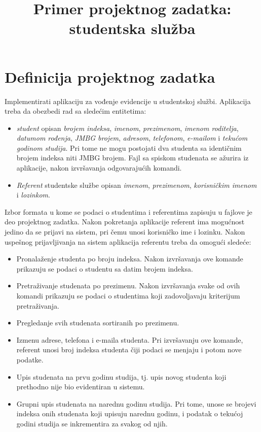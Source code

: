 \documentclass[a4paper]{article}
\title{Primer projektnog zadatka: studentska služba}
\date{}
\begin{document}
\maketitle

\section{Definicija projektnog zadatka}

Implementirati aplikaciju za vođenje evidencije u studentskoj službi. Aplikacija
treba da obezbedi rad sa sledećim entitetima:

\begin{itemize}
  \item \textit{student} opisan \textit{brojem indeksa}, \textit{imenom},
  \textit{prezimenom}, \textit{imenom roditelja},
  \textit{datumom rođenja}, \textit{JMBG brojem}, \textit{adresom},
  \textit{telefonom}, \textit{e-mailom} i \textit{tekućom godinom studija}. Pri
  tome ne mogu postojati dva studenta sa identičnim brojem indeksa niti JMBG
  brojem. Fajl sa spiskom studenata se ažurira iz aplikacije, nakon izvršavanja
  odgovarajućih komandi.

  \item \textit{Referent} studentske službe opisan \textit{imenom},
  \textit{prezimenom}, \textit{korisničkim imenom} i \textit{lozinkom}.
\end{itemize}

Izbor formata u kome se podaci o studentima i referentima zapisuju u fajlove je
deo projektnog zadatka. Nakon pokretanja aplikacije referent ima mogućnost
jedino da se prijavi na sistem, pri čemu unosi korisničko ime i lozinku. Nakon
uspešnog prijavljivanja na sistem aplikacija referentu treba da omogući sledeće:

\begin{itemize}
  \item Pronalaženje studenta po broju indeksa. Nakon izvršavanja ove komande
  prikazuju se podaci o studentu sa datim brojem indeksa.

  \item Pretraživanje studenata po prezimenu. Nakon izvršavanja svake od ovih
  komandi prikazuju se podaci o studentima koji zadovoljavaju kriterijum
  pretraživanja.

  \item Pregledanje svih studenata sortiranih po prezimenu.

  \item Izmenu adrese, telefona i e-maila studenta. Pri izvršavanju ove komande,
  referent unosi broj indeksa studenta čiji podaci se menjaju i potom nove 
  podatke.
  
  \item Upis studenata na prvu godinu studija, tj. upis novog studenta koji 
  prethodno nije bio evidentiran u sistemu.
  
  \item Grupni upis studenata na narednu godinu studija. Pri tome, unose se
  brojevi indeksa onih studenata koji upisuju narednu godinu, i podatak o
tekućoj
  godini studija se inkrementira za svakog od njih.
  
\end{itemize}
\end{document}
